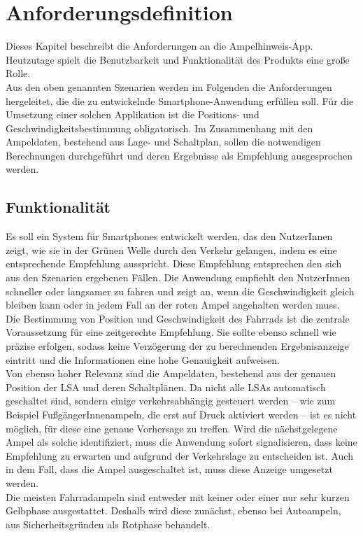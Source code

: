 \chapter{\label{chap:anforderungen}Anforderungsdefinition}
Dieses Kapitel beschreibt die Anforderungen an die Ampelhinweis-\gls{App}. Heutzutage spielt die Benutzbarkeit und Funktionalität des Produkts eine große Rolle.\\
Aus den oben genannten Szenarien werden im Folgenden die Anforderungen hergeleitet, die die zu entwickelnde \gls{Smartphone}-Anwendung erfüllen soll. Für die Umsetzung einer solchen Applikation ist die Positions- und Geschwindigkeitsbestimmung obligatorisch. Im Zusammenhang mit den Ampeldaten, bestehend aus Lage- und Schaltplan, sollen die notwendigen Berechnungen durchgeführt und deren Ergebnisse als Empfehlung ausgesprochen werden.
\section{Funktionalität}
Es soll ein System für \glspl{Smartphone} entwickelt werden, das den NutzerInnen zeigt, wie sie in der Grünen Welle durch den Verkehr gelangen, indem es eine entsprechende Empfehlung ausspricht. Diese Empfehlung entsprechen den sich aus den Szenarien ergebenen Fällen. Die Anwendung empfiehlt den NutzerInnen schneller oder langsamer zu fahren und zeigt an, wenn die Geschwindigkeit gleich bleiben kann oder in jedem Fall an der roten Ampel angehalten werden muss.\\ 
Die Bestimmung von Position und Geschwindigkeit des Fahrrads ist die zentrale Voraussetzung für eine zeitgerechte Empfehlung. Sie sollte ebenso schnell wie präzise erfolgen, sodass keine Verzögerung der zu berechnenden Ergebnisanzeige eintritt und die Informationen eine hohe Genauigkeit aufweisen.\\
Von ebenso hoher Relevanz sind die Ampeldaten, bestehend aus der genauen Position der \gls{LSA} und deren Schaltplänen. Da nicht alle \glspl{LSA} automatisch geschaltet sind, sondern einige verkehrsabhängig gesteuert werden -- wie zum Beispiel FußgängerInnenampeln, die erst auf Druck aktiviert werden -- ist es nicht möglich, für diese eine genaue Vorhersage zu treffen. Wird die nächstgelegene Ampel als solche identifiziert, muss die Anwendung sofort signalisieren, dass keine Empfehlung zu erwarten und aufgrund der Verkehrslage zu entscheiden ist. Auch in dem Fall, dass die Ampel ausgeschaltet ist, muss diese Anzeige umgesetzt werden.\\
Die meisten Fahrradampeln sind entweder mit keiner oder einer nur sehr kurzen Gelbphase ausgestattet. Deshalb wird diese zunächst, ebenso bei Autoampeln, aus Sicherheitsgründen als Rotphase behandelt.
